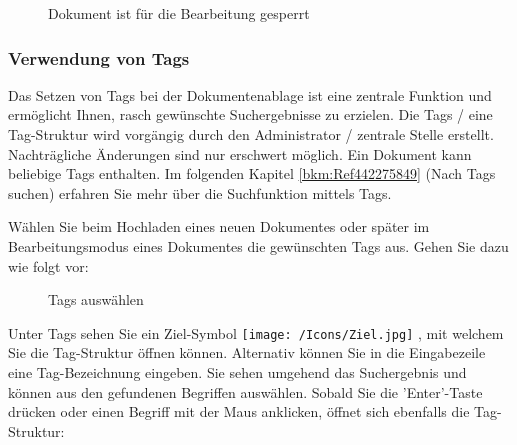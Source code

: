 \begin{figure}[H]
\caption{Dokument ist für die Bearbeitung gesperrt}
\end{figure}

\subsubsection{Verwendung von Tags}
\label{bkm:Ref201801219}

Das Setzen von Tags bei der Dokumentenablage ist eine zentrale Funktion und ermöglicht Ihnen, rasch gewünschte Suchergebnisse zu erzielen. Die Tags / eine Tag-Struktur wird vorgängig durch den Administrator / zentrale Stelle erstellt. Nachträgliche Änderungen sind nur erschwert möglich. Ein Dokument kann beliebige Tags enthalten. Im folgenden Kapitel \ref{bkm:Ref442275849} (Nach Tags suchen) erfahren Sie mehr über die Suchfunktion mittels Tags. \newline

\vspace{\baselineskip}

Wählen Sie beim Hochladen eines neuen Dokumentes oder später im Bearbeitungsmodus eines Dokumentes die gewünschten Tags aus. Gehen Sie dazu wie folgt vor: 

\begin{figure}[H]
\caption{Tags auswählen}
\end{figure}

Unter Tags  sehen Sie ein Ziel-Symbol \texttt{[image: /Icons/Ziel.jpg]} , mit welchem Sie die Tag-Struktur öffnen können. Alternativ können Sie in die Eingabezeile  eine Tag-Bezeichnung eingeben. Sie sehen umgehend das Suchergebnis und können aus den gefundenen Begriffen auswählen. Sobald Sie die 'Enter'-Taste drücken oder einen Begriff mit der Maus anklicken, öffnet sich ebenfalls die Tag-Struktur:

